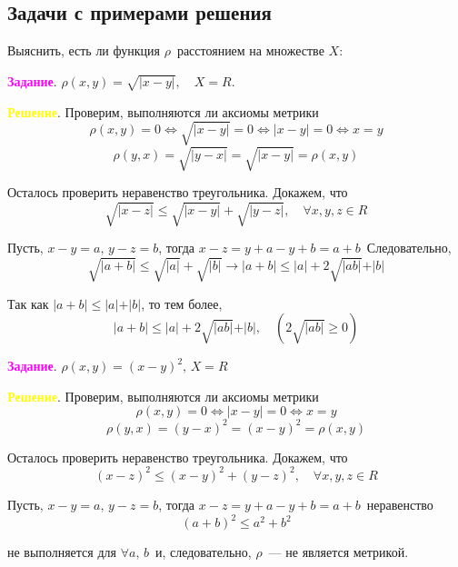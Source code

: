 \newpage
{}
\subsection{Задачи с примерами решения}
{\color{white}
\noindent
\textcolor{light-blue}{Выяснить, есть ли функция} $\rho$\,
\textcolor{light-blue}{расстоянием на множестве} $X$:


\noindent
\textcolor{magenta}{\textbf{Задание}}. $\rho(x, y) = \sqrt{\vert x - y\vert}, \quad X = R$.


\noindent
\textcolor{yellow}{\textbf{Решение}}. Проверим, выполняются ли аксиомы метрики
$$
\rho(x, y) = 0 \Leftrightarrow \sqrt{\vert x - y\vert} = 0
\Leftrightarrow \vert x - y \vert = 0 \Leftrightarrow x = y
$$
$$
\rho(y, x) = \sqrt{\vert y - x\vert} = \sqrt{\vert x - y\vert} =
\rho (x, y)
$$

\noindent
Осталось проверить неравенство треугольника. Докажем, что
$$
\sqrt{\vert x - z\vert} \leqslant \sqrt{\vert x - y\vert} +
\sqrt{\vert y - z\vert},\quad \forall x, y, z \in R
$$

\noindent
Пусть, $x-y=a,\, y-z=b$, тогда $x − z = y + a − y + b = a + b$\,
Следовательно,
$$
\sqrt{\vert a + b\vert} \leqslant \sqrt{\vert a \vert} +
\sqrt{\vert b \vert} \to \vert a + b\vert \leqslant \vert a\vert +
2\sqrt{\vert ab\vert} + \vert b\vert
$$

\noindent
Так как $\vert a + b\vert \leqslant \vert a\vert + \vert b\vert$,
то тем более,
$$
\vert a + b\vert \leqslant \vert a\vert + 2\sqrt{\vert ab\vert}
+ \vert b\vert, \quad \left(2\sqrt{\vert ab\vert} \geqslant 0\right)
$$

\noindent
\textcolor{magenta}{\textbf{Задание}}. $\rho(x, y)=(x-y)^2,\, X = R$

\noindent
\textcolor{yellow}{\textbf{Решение}}. Проверим, выполняются ли аксиомы метрики
$$
\rho(x, y) = 0 \Leftrightarrow \vert x - y\vert = 0
\Leftrightarrow  x = y
$$
$$
\rho(y, x) = (y -x)^2 = (x-y)^2 = \rho(x, y)
$$

\noindent
Осталось проверить неравенство треугольника. Докажем, что
$$
(x-z)^2 \leqslant (x-y)^2 + (y-z)^2,\quad \forall x, y, z \in R
$$

\noindent
Пусть, $x-y=a,\, y-z=b$, тогда $x − z = y + a − y + b = a + b$\,
неравенство
$$
(a + b)^2 \leqslant a^2 + b^2
$$

\noindent
не выполняется для $\forall a,\, b$\,  и, следовательно, $\rho$\, ---
не является метрикой.

}

